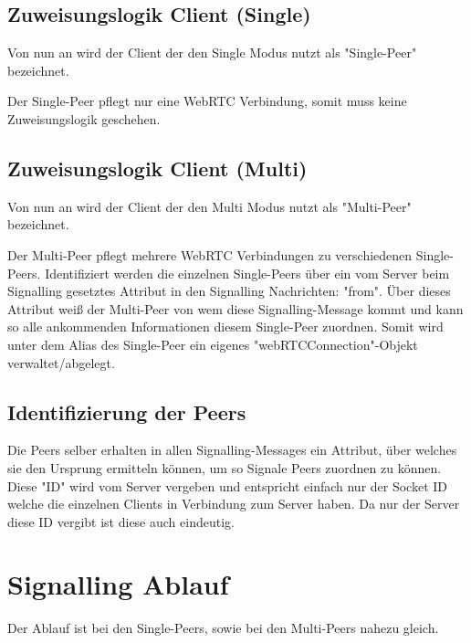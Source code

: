 \subsection{Zuweisungslogik Client (Single)}
Von nun an wird der Client der den Single Modus nutzt als "Single-Peer" 
bezeichnet.

Der Single-Peer pflegt nur eine WebRTC Verbindung, somit muss keine 
Zuweisungslogik geschehen.



\subsection{Zuweisungslogik Client (Multi)}
Von nun an wird der Client der den Multi Modus nutzt als "Multi-Peer" 
bezeichnet.


Der Multi-Peer pflegt mehrere WebRTC Verbindungen zu verschiedenen Single-Peers. 
Identifiziert werden die einzelnen Single-Peers über ein vom Server beim 
Signalling gesetztes Attribut in den Signalling Nachrichten: "from". Über dieses 
Attribut weiß der Multi-Peer von wem diese Signalling-Message kommt und kann so 
alle ankommenden Informationen diesem Single-Peer zuordnen. Somit wird unter dem 
Alias des Single-Peer ein eigenes "webRTCConnection"-Objekt verwaltet/abgelegt.



\subsection{Identifizierung der Peers}
Die Peers selber erhalten in allen Signalling-Messages ein Attribut, über 
welches sie den Ursprung ermitteln können, um so Signale Peers zuordnen zu 
können. Diese "ID" wird vom Server vergeben und entspricht einfach nur der 
Socket ID welche die einzelnen Clients in Verbindung zum Server haben.
Da nur der Server diese ID vergibt ist diese auch eindeutig.



\section{Signalling Ablauf}
Der Ablauf ist bei den Single-Peers, sowie bei den Multi-Peers nahezu gleich.



